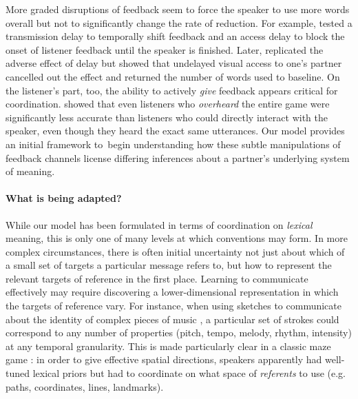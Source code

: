 More graded disruptions of feedback seem to force the speaker to use more words overall but not to significantly change the rate of reduction. 
For example,  tested a transmission delay to temporally shift feedback and an access delay to block the onset of listener feedback until the speaker is finished. 
Later,  replicated the adverse effect of delay but showed that undelayed visual access to one's partner cancelled out the effect and returned the number of words used to baseline. 
On the listener's part, too, the ability to actively \emph{give} feedback appears critical for coordination. 
 showed that even listeners who \emph{overheard} the entire game were significantly less accurate than listeners who could directly interact with the speaker, even though they heard the exact same utterances.
Our model provides an initial framework to begin understanding how these subtle manipulations of feedback channels license differing inferences about a partner's underlying system of meaning.

\paragraph{What is being adapted?}

While our model has been formulated in terms of coordination on \emph{lexical} meaning, this is only one of many levels at which conventions may form. 
In more complex circumstances, there is often initial uncertainty not just about which of a small set of targets a particular message refers to, but how to represent the relevant targets of reference in the first place. 
Learning to communicate effectively may require discovering a lower-dimensional representation in which the targets of reference vary.
For instance, when using sketches to communicate about the identity of complex pieces of music \cite{HealeySwobodaUmataKing07_GraphicalLanguageGames}, a particular set of strokes could correspond to any number of properties (pitch, tempo, melody, rhythm, intensity) at any temporal granularity. 
This is made particularly clear in a classic maze game \cite{GarrodAnderson87_SayingWhatYouMean}: in order to give effective spatial directions, speakers apparently had well-tuned lexical priors but had to coordinate on what space of \emph{referents} to use (e.g. paths, coordinates, lines, landmarks). 


